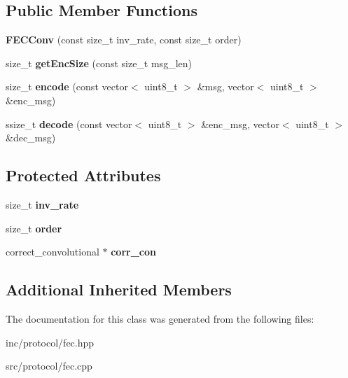 \subsection*{Public Member Functions}
\begin{DoxyCompactItemize}
\item 
\mbox{\label{classFECConv_a884d27178ca0484f4692b78fa31fd898}} 
{\bfseries F\+E\+C\+Conv} (const size\+\_\+t inv\+\_\+rate, const size\+\_\+t order)
\item 
\mbox{\label{classFECConv_a3b49acf69440d2677e3181513b9f3592}} 
size\+\_\+t {\bfseries get\+Enc\+Size} (const size\+\_\+t msg\+\_\+len)
\item 
\mbox{\label{classFECConv_ae3e796d0e026dca718ed6384653a4564}} 
size\+\_\+t {\bfseries encode} (const vector$<$ uint8\+\_\+t $>$ \&msg, vector$<$ uint8\+\_\+t $>$ \&enc\+\_\+msg)
\item 
\mbox{\label{classFECConv_afd897d6756bbbe4874942654e91a95e3}} 
ssize\+\_\+t {\bfseries decode} (const vector$<$ uint8\+\_\+t $>$ \&enc\+\_\+msg, vector$<$ uint8\+\_\+t $>$ \&dec\+\_\+msg)
\end{DoxyCompactItemize}
\subsection*{Protected Attributes}
\begin{DoxyCompactItemize}
\item 
\mbox{\label{classFECConv_adbb15dc1ad17f9613559aa2527892be1}} 
size\+\_\+t {\bfseries inv\+\_\+rate}
\item 
\mbox{\label{classFECConv_aeb8954d7d5bd977494cca5a6a35a9dbc}} 
size\+\_\+t {\bfseries order}
\item 
\mbox{\label{classFECConv_a0978a376b15f30e89b8db481e229e0c7}} 
correct\+\_\+convolutional $\ast$ {\bfseries corr\+\_\+con}
\end{DoxyCompactItemize}
\subsection*{Additional Inherited Members}


The documentation for this class was generated from the following files\+:\begin{DoxyCompactItemize}
\item 
inc/protocol/fec.\+hpp\item 
src/protocol/fec.\+cpp\end{DoxyCompactItemize}
